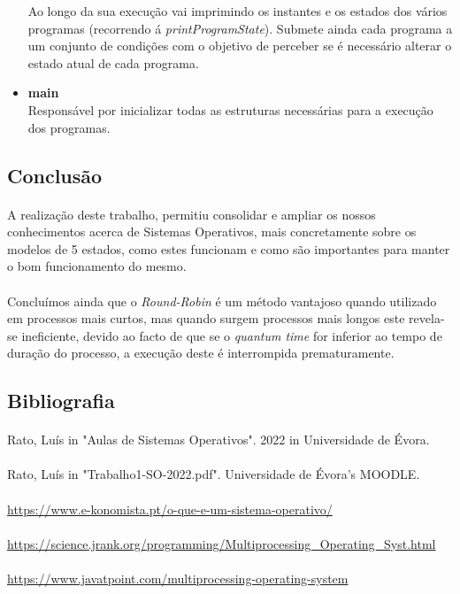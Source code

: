 \documentclass{article}
\begin{document}
\begin{itemize}
        Ao longo da sua execução vai imprimindo os instantes e os estados dos vários programas (recorrendo á \emph{printProgramState}). Submete ainda cada programa a um conjunto de condições com o objetivo de perceber se é necessário alterar o estado atual de cada programa.
    \item \textbf{main}\\
    Responsável por inicializar todas as estruturas necessárias para a execução dos programas.

    
\end{itemize}


\begin{center}
    \section*{Conclusão}
\end{center}
\paragraph{}
A realização deste trabalho, permitiu consolidar e ampliar os nossos conhecimentos acerca de Sistemas Operativos, mais concretamente sobre os modelos de 5 estados, como estes funcionam e como são importantes para manter o bom funcionamento do mesmo.
\paragraph{}
Concluímos ainda que o \emph{Round-Robin} é um método vantajoso quando utilizado em processos mais curtos, mas quando surgem processos mais longos este revela-se ineficiente, devido ao facto de que se o \emph{quantum time} for inferior ao tempo de duração do processo, a execução deste é interrompida prematuramente. 

\begin{center}
    \section*{Bibliografia}
\end{center}
\paragraph{}
Rato, Luís in "Aulas de Sistemas Operativos". 2022 in Universidade de Évora.
\vspace{-0.3cm}
\paragraph{}
Rato, Luís in "Trabalho1-SO-2022.pdf". Universidade de Évora's MOODLE.
\vspace{-0.3cm}
\paragraph{}
\url{https://www.e-konomista.pt/o-que-e-um-sistema-operativo/}
\vspace{-0.3cm}
\paragraph{}
\url{https://science.jrank.org/programming/Multiprocessing_Operating_Syst.html}
\vspace{-0.3cm}
\paragraph{}
\url{https://www.javatpoint.com/multiprocessing-operating-system}
\end{document}
